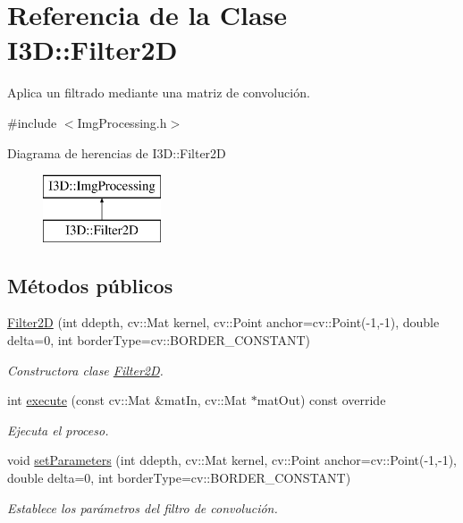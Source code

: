 \hypertarget{class_i3_d_1_1_filter2_d}{}\section{Referencia de la Clase I3D\+:\+:Filter2D}
\label{class_i3_d_1_1_filter2_d}


Aplica un filtrado mediante una matriz de convolución.  




{\ttfamily \#include $<$Img\+Processing.\+h$>$}

Diagrama de herencias de I3D\+:\+:Filter2D\begin{figure}[H]
\begin{center}
\leavevmode
\includegraphics[height=2.000000cm]{class_i3_d_1_1_filter2_d}
\end{center}
\end{figure}
\subsection*{Métodos públicos}
\begin{DoxyCompactItemize}
\item 
\hyperlink{class_i3_d_1_1_filter2_d_aa34212c2a0de19d4eeba64ec222e8a69}{Filter2D} (int ddepth, cv\+::\+Mat kernel, cv\+::\+Point anchor=cv\+::\+Point(-\/1,-\/1), double delta=0, int border\+Type=cv\+::\+B\+O\+R\+D\+E\+R\+\_\+\+C\+O\+N\+S\+T\+A\+NT)
\begin{DoxyCompactList}\small\item\em Constructora clase \hyperlink{class_i3_d_1_1_filter2_d}{Filter2D}. \end{DoxyCompactList}\item 
int \hyperlink{class_i3_d_1_1_filter2_d_a46f44465658be004e62d7e72cc40cb84}{execute} (const cv\+::\+Mat \&mat\+In, cv\+::\+Mat $\ast$mat\+Out) const  override
\begin{DoxyCompactList}\small\item\em Ejecuta el proceso. \end{DoxyCompactList}\item 
void \hyperlink{class_i3_d_1_1_filter2_d_acf15b9a9958739c909768325fad1a3d7}{set\+Parameters} (int ddepth, cv\+::\+Mat kernel, cv\+::\+Point anchor=cv\+::\+Point(-\/1,-\/1), double delta=0, int border\+Type=cv\+::\+B\+O\+R\+D\+E\+R\+\_\+\+C\+O\+N\+S\+T\+A\+NT)
\begin{DoxyCompactList}\small\item\em Establece los parámetros del filtro de convolución. \end{DoxyCompactList}\end{DoxyCompactItemize}
